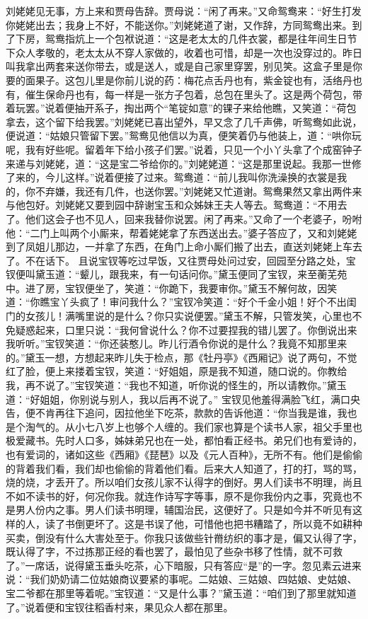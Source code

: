 \documentclass[12pt,oneside]{book}
\begin{document}
刘姥姥见无事，方上来和贾母告辞。贾母说：“闲了再来。”又命鸳鸯来：“好生打发你姥姥出去；我身上不好，不能送你。”刘姥姥道了谢，又作辞，方同鸳鸯出来。到了下房，鸳鸯指炕上一个包袱说道：“这是老太太的几件衣裳，都是往年间生日节下众人孝敬的，老太太从不穿人家做的，收着也可惜，却是一次也没穿过的。昨日叫我拿出两套来送你带去，或是送人，或是自己家里穿罢，别见笑。这盒子里是你要的面果子。这包儿里是你前儿说的药：梅花点舌丹也有，紫金锭也有，活络丹也有，催生保命丹也有，每一样是一张方子包着，总包在里头了。这是两个荷包，带着玩罢。”说着便抽开系子，掏出两个“笔锭如意”的锞子来给他瞧，又笑道：“荷包拿去，这个留下给我罢。”刘姥姥已喜出望外，早又念了几千声佛，听鸳鸯如此说，便说道：“姑娘只管留下罢。”鸳鸯见他信以为真，便笑着仍与他装上，道：“哄你玩呢，我有好些呢。留着年下给小孩子们罢。”说着，只见一个小丫头拿了个成窑钟子来递与刘姥姥，道：“这是宝二爷给你的。”刘姥姥道：“这是那里说起。我那一世修了来的，今儿这样。”说着便接了过来。鸳鸯道：“前儿我叫你洗澡换的衣裳是我的，你不弃嫌，我还有几件，也送你罢。”刘姥姥又忙道谢。鸳鸯果然又拿出两件来与他包好。刘姥姥又要到园中辞谢宝玉和众姊妹王夫人等去。鸳鸯道：“不用去了。他们这会子也不见人，回来我替你说罢。闲了再来。”又命了一个老婆子，吩咐他：“二门上叫两个小厮来，帮着姥姥拿了东西送出去。”婆子答应了，又和刘姥姥到了凤姐儿那边，一并拿了东西，在角门上命小厮们搬了出去，直送刘姥姥上车去了。不在话下。
且说宝钗等吃过早饭，又往贾母处问过安，回园至分路之处，宝钗便叫黛玉道：“颦儿，跟我来，有一句话问你。”黛玉便同了宝钗，来至蘅芜苑中。进了房，宝钗便坐了，笑道：“你跪下，我要审你。”黛玉不解何故，因笑道：“你瞧宝丫头疯了！审问我什么？”宝钗冷笑道：“好个千金小姐！好个不出闺门的女孩儿！满嘴里说的是什么？你只实说便罢。”黛玉不解，只管发笑，心里也不免疑惑起来，口里只说：“我何曾说什么？你不过要捏我的错儿罢了。你倒说出来我听听。”宝钗笑道：“你还装憨儿。昨儿行酒令你说的是什么？我竟不知那里来的。”黛玉一想，方想起来昨儿失于检点，那《牡丹亭》《西厢记》说了两句，不觉红了脸，便上来搂着宝钗，笑道：“好姐姐，原是我不知道，随口说的。你教给我，再不说了。”宝钗笑道：“我也不知道，听你说的怪生的，所以请教你。”黛玉道：“好姐姐，你别说与别人，我以后再不说了。”
宝钗见他羞得满脸飞红，满口央告，便不肯再往下追问，因拉他坐下吃茶，款款的告诉他道：“你当我是谁，我也是个淘气的。从小七八岁上也够个人缠的。我们家也算是个读书人家，祖父手里也极爱藏书。先时人口多，姊妹弟兄也在一处，都怕看正经书。弟兄们也有爱诗的，也有爱词的，诸如这些《西厢》《琵琶》以及《元人百种》，无所不有。他们是偷偷的背着我们看，我们却也偷偷的背着他们看。后来大人知道了，打的打，骂的骂，烧的烧，才丢开了。所以咱们女孩儿家不认得字的倒好。男人们读书不明理，尚且不如不读书的好，何况你我。就连作诗写字等事，原不是你我份内之事，究竟也不是男人份内之事。男人们读书明理，辅国治民，这便好了。只是如今并不听见有这样的人，读了书倒更坏了。这是书误了他，可惜他也把书糟踏了，所以竟不如耕种买卖，倒没有什么大害处至于。你我只该做些针黹纺织的事才是，偏又认得了字，既认得了字，不过拣那正经的看也罢了，最怕见了些杂书移了性情，就不可救了。”一席话，说得黛玉垂头吃茶，心下暗服，只有答应“是”的一字。忽见素云进来说：“我们奶奶请二位姑娘商议要紧的事呢。二姑娘、三姑娘、四姑娘、史姑娘、宝二爷都在那里等着呢。”宝钗道：“又是什么事？”黛玉道：“咱们到了那里就知道了。”说着便和宝钗往稻香村来，果见众人都在那里。
\end{document}
